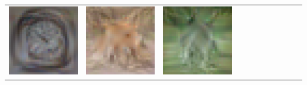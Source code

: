 \documentclass[main.tex]{subfiles}
\begin{document}
{\begin{center}
\begin{tabular}{ccccccccccc}
    \includegraphics[align=c,width=\coverwidth\linewidth]{figures/cover/cifar/clock_0.pdf} &
    \includegraphics[align=c,width=\coverwidth\linewidth]{figures/cover/cifar/fox_0.pdf} &
    \includegraphics[align=c,width=\coverwidth\linewidth]{figures/cover/cifar/kangaroo_0.pdf} &

\end{tabular}
\end{center}}
\end{document}
